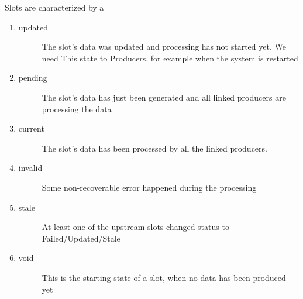 \documentclass[letterpaper,10pt,english]{sphinxmanual}
\begin{document}
Slots are characterized by a 
\begin{enumerate}
\item {} \begin{description}
\item[{updated}] \leavevmode
The slot’s data was updated and processing has not started yet. We need This
state to  Producers, for example when the system is restarted

\end{description}

\item {} \begin{description}
\item[{pending}] \leavevmode
The slot’s data has just been generated and all linked producers are processing
the data

\end{description}

\item {} \begin{description}
\item[{current}] \leavevmode
The slot’s data has been processed by all the linked producers.

\end{description}

\item {} \begin{description}
\item[{invalid}] \leavevmode
Some non-recoverable error happened during the processing

\end{description}

\item {} \begin{description}
\item[{stale}] \leavevmode
At least one of the upstream slots changed status to Failed/Updated/Stale

\end{description}

\item {} \begin{description}
\item[{void}] \leavevmode
This is the starting state of a slot, when no data has been produced yet

\end{description}

\end{enumerate}
\end{document}
